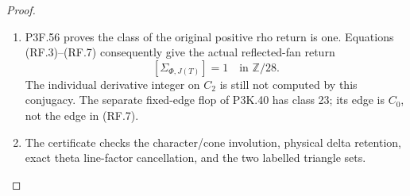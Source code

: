 \begin{proof}
\begin{enumerate}[label=\arabic*.]
\item P3F.56 proves the class of the original positive rho return is one.
Equations (RF.3)--(RF.7) consequently give the actual reflected-fan
return
\[
                    [\Sigma_{\Phi,J(T)}]=1
                             \quad\text{in }\mathbb Z/28.
                                                               \tag{RF.8}
\]
The individual derivative integer on \(C_2\) is still not computed
by this conjugacy. The separate fixed-edge flop of P3K.40 has class
23; its edge is \(C_0\), not the edge in (RF.7).

\item The certificate  checks the
character/cone involution, physical delta retention, exact theta
line-factor cancellation, and the two labelled triangle sets.

\end{enumerate}
\end{proof}